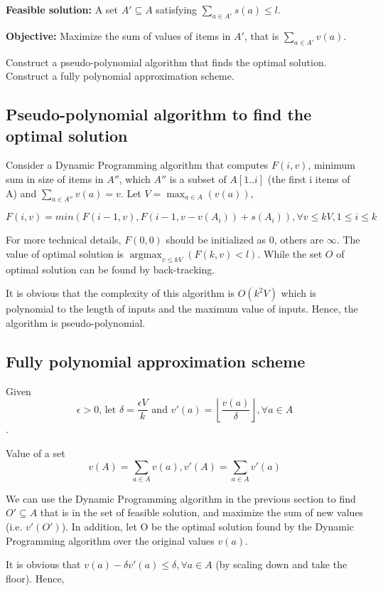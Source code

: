 \documentclass{article}
\DeclareMathOperator*{\argmax}{argmax}
\begin{document}
\textbf{Feasible solution:} A set $A'\subseteq A$ satisfying $\sum_{a\in A'}s(a) \le l$.

\textbf{Objective:} Maximize the sum of values of items in $A'$, that is $\sum_{a\in A'}v(a)$.

Construct a pseudo-polynomial algorithm that finds the optimal solution. Construct a fully polynomial approximation scheme.

\subsection{Pseudo-polynomial algorithm to find the optimal solution}
Consider a Dynamic Programming algorithm that computes $F(i,v)$, minimum sum in size of items in $A''$, which $A''$ is a subset of $A[1..i]$ (the first i items of A) and $\displaystyle \sum_{a\in A''}v(a)=v$. Let $\displaystyle V=\max_{a\in A}(v(a))$, 

$$F(i,v)=min(F(i-1,v),F(i-1,v-v(A_i))+s(A_i)),\forall v\le kV, 1\le i\le k$$

For more technical details, $F(0,0)$ should be initialized as 0, others are $\infty$. The value of optimal solution is $\displaystyle \argmax_{v\le kV}(F(k,v)<l)$. While the set $O$ of optimal solution can be found by back-tracking.

It is obvious that the complexity of this algorithm is $O(k^2 V)$ which is polynomial to the length of inputs and the maximum value of inputs. Hence, the algorithm is pseudo-polynomial.

\subsection{Fully polynomial approximation scheme}

Given $$\epsilon > 0 \text{, let } \delta=\frac{\epsilon V}{k} \text{ and } v'(a)=\left \lfloor \frac{v(a)}{\delta} \right \rfloor, \forall a\in A$$.

Value of a set $$v(A)=\sum_{a\in A}v(a), v'(A)=\sum_{a\in A}v'(a)$$

We can use the Dynamic Programming algorithm in the previous section to find $O' \subseteq A$ that is in the set of feasible solution, and maximize the sum of new values (i.e. $v'(O')$). In addition, let O be the optimal solution found by the Dynamic Programming algorithm over the original values $v(a)$.

It is obvious that $v(a)-\delta v'(a)\le \delta, \forall a\in A$ (by scaling down and take the floor). Hence,
\end{document}
